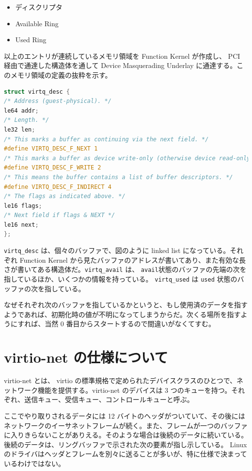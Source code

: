 \documentclass[a4paper,11pt,report]{ltjsbook}
\begin{document}
\begin{itemize}
  \item ディスクリプタ
  \item Available Ring
  \item Used Ring
\end{itemize}

以上のエントリが連続しているメモリ領域を Function Kernel が作成し、 PCI 経由で通達した構造体を通して Device Masquerading Underlay に通達する。このメモリ領域の定義の抜粋を示す。

\begin{lstlisting}[language=C]
struct virtq_desc {
/* Address (guest-physical). */
le64 addr;
/* Length. */
le32 len;
/* This marks a buffer as continuing via the next field. */
#define VIRTQ_DESC_F_NEXT 1
/* This marks a buffer as device write-only (otherwise device read-only). */
#define VIRTQ_DESC_F_WRITE 2
/* This means the buffer contains a list of buffer descriptors. */
#define VIRTQ_DESC_F_INDIRECT 4
/* The flags as indicated above. */
le16 flags;
/* Next field if flags & NEXT */
le16 next;
};
\end{lstlisting}

\texttt{virtq\_desc} は、個々のバッファで、図のように linked list になっている。それぞれ Function Kernel から見たバッファのアドレスが書いてあり、また有効な長さが書いてある構造体だ。\texttt{virtq\_avail} は、 \texttt{avail}状態のバッファの先端の次を指しているほか、いくつかの情報を持っている。 \texttt{virtq\_used} は \texttt{used} 状態のバッファの次を指している。

なぜそれぞれ次のバッファを指しているかというと、もし使用済のデータを指すようであれば、初期化時の値が不明になってしまうからだ。次くる場所を指すようにすれば、当然 0 番目からスタートするので間違いがなくてすむ。

\section{virtio-net の仕様について}

virtio-net とは、 virtio の標準規格\cite{virtio_spec}で定められたデバイスクラスのひとつで、ネットワーク機能を提供する。virtio-net のデバイスは 3 つのキューを持つ。それぞれ、送信キュー、受信キュー、コントロールキューと呼ぶ。

ここでやり取りされるデータには 12 バイトのヘッダがついていて、その後にはネットワークのイーサネットフレームが続く。また、フレームが一つのバッファに入りきらないことがありえる。そのような場合は後続のデータに続いている。後続のデータは、リングバッファで示された次の要素が指し示している。 Linux のドライバはヘッダとフレームを別々に送ることが多いが、特に仕様で決まっているわけではない。
\end{document}
